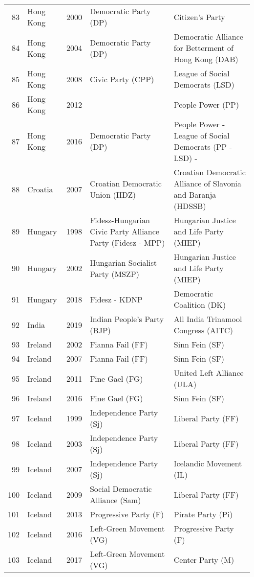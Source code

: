 \documentclass[12pt]{article}
\begin{document}
\begin{table}[ht]
\begin{footnotesize}
\begin{tabular}{rllll}
  83 & Hong Kong & 2000 &   Democratic Party (DP) &   Citizen's Party \\ 
  84 & Hong Kong & 2004 &   Democratic Party (DP) &   Democratic Alliance for Betterment of Hong Kong (DAB) \\ 
  85 & Hong Kong & 2008 &   Civic Party (CPP) &   League of Social Democrats (LSD) \\ 
  86 & Hong Kong & 2012 &  &   People Power (PP) \\ 
  87 & Hong Kong & 2016 &   Democratic Party (DP) &   People Power - League of Social Democrats (PP - LSD) -  \\ 
  88 & Croatia & 2007 &   Croatian Democratic Union (HDZ) &   Croatian Democratic Alliance of Slavonia and Baranja (HDSSB) \\ 
  89 & Hungary & 1998 &   Fidesz-Hungarian Civic Party Alliance Party (Fidesz - MPP) &   Hungarian Justice and Life Party (MIEP) \\ 
  90 & Hungary & 2002 &   Hungarian Socialist Party (MSZP) &   Hungarian Justice and Life Party (MIEP) \\ 
  91 & Hungary & 2018 &   Fidesz - KDNP &   Democratic Coalition (DK) \\ 
  92 & India & 2019 &  Indian People's Party (BJP) &  All India Trinamool Congress (AITC) \\ 
  93 & Ireland & 2002 &   Fianna Fail (FF) &   Sinn Fein (SF) \\ 
  94 & Ireland & 2007 &   Fianna Fail (FF) &   Sinn Fein (SF) \\ 
  95 & Ireland & 2011 &   Fine Gael (FG) &   United Left Alliance (ULA) \\ 
  96 & Ireland & 2016 &   Fine Gael (FG) &   Sinn Fein (SF) \\ 
  97 & Iceland & 1999 &   Independence Party (Sj) &   Liberal Party (FF) \\ 
  98 & Iceland & 2003 &   Independence Party (Sj) &   Liberal Party (FF) \\ 
  99 & Iceland & 2007 &   Independence Party (Sj) &   Icelandic Movement (IL) \\ 
  100 & Iceland & 2009 &   Social Democratic Alliance (Sam) &   Liberal Party (FF) \\ 
  101 & Iceland & 2013 &   Progressive Party (F) &   Pirate Party (Pi) \\ 
  102 & Iceland & 2016 &   Left-Green Movement (VG) &   Progressive Party (F) \\ 
  103 & Iceland & 2017 &   Left-Green Movement (VG) &   Center Party (M) \\ 

\end{tabular}
\end{footnotesize}
\end{table}
\end{document}
